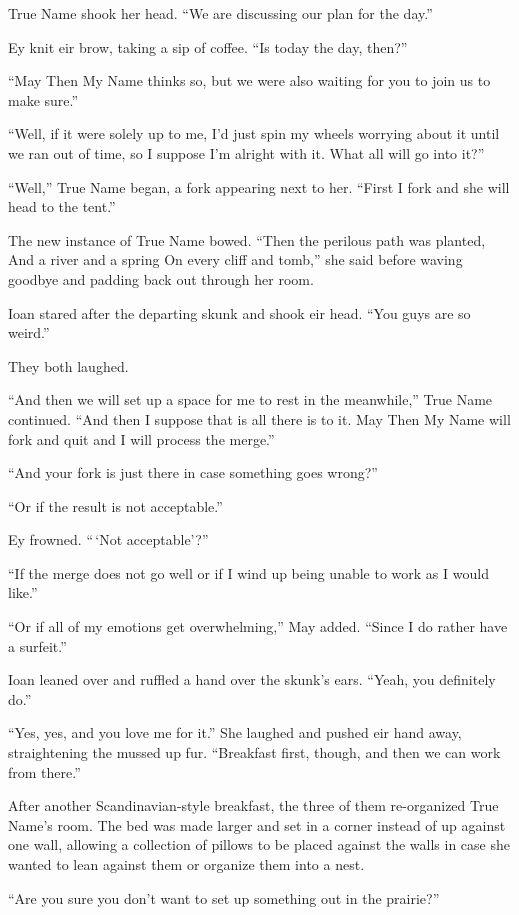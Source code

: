 True Name shook her head. ``We are discussing our plan for the day.''

Ey knit eir brow, taking a sip of coffee. ``Is today the day, then?''

``May Then My Name thinks so, but we were also waiting for you to join us to make sure.''

``Well, if it were solely up to me, I'd just spin my wheels worrying about it until we ran out of time, so I suppose I'm alright with it. What all will go into it?''

``Well,'' True Name began, a fork appearing next to her. ``First I fork and she will head to the tent.''

The new instance of True Name bowed. ``Then the perilous path was planted, And a river and a spring On every cliff and tomb,'' she said before waving goodbye and padding back out through her room.

Ioan stared after the departing skunk and shook eir head. ``You guys are so weird.''

They both laughed.

``And then we will set up a space for me to rest in the meanwhile,'' True Name continued. ``And then I suppose that is all there is to it. May Then My Name will fork and quit and I will process the merge.''

``And your fork is just there in case something goes wrong?''

``Or if the result is not acceptable.''

Ey frowned. ``\,`Not acceptable'?''

``If the merge does not go well or if I wind up being unable to work as I would like.''

``Or if all of my emotions get overwhelming,'' May added. ``Since I do rather have a surfeit.''

Ioan leaned over and ruffled a hand over the skunk's ears. ``Yeah, you definitely do.''

``Yes, yes, and you love me for it.'' She laughed and pushed eir hand away, straightening the mussed up fur. ``Breakfast first, though, and then we can work from there.''

After another Scandinavian-style breakfast, the three of them re-organized True Name's room. The bed was made larger and set in a corner instead of up against one wall, allowing a collection of pillows to be placed against the walls in case she wanted to lean against them or organize them into a nest.

``Are you sure you don't want to set up something out in the prairie?''

